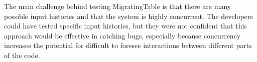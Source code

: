 



The main challenge behind testing MigratingTable is that there are many possible input histories and that the system is highly concurrent. The developers could have tested specific input histories, but they were not confident that this approach would be effective in catching bugs, especially because concurrency increases the potential for difficult to foresee interactions between different parts of the code.

